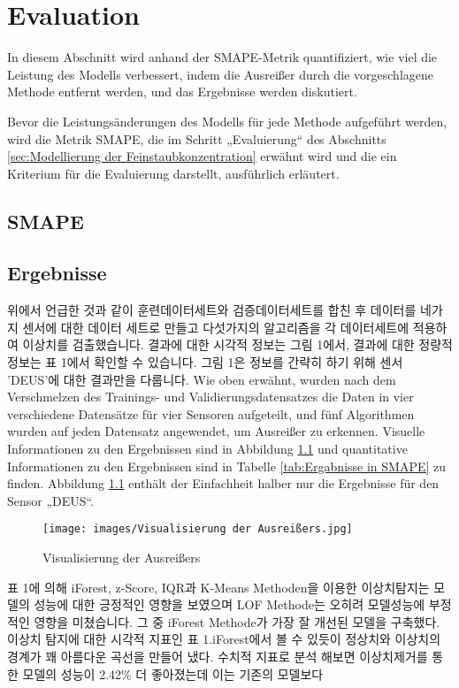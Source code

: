 \chapterpage\chapter{Evaluation}
    In diesem Abschnitt wird anhand der SMAPE-Metrik quantifiziert, wie viel die Leistung des Modells verbessert, indem die Ausreißer durch die vorgeschlagene Methode entfernt werden, und das Ergebnisse werden diskutiert.
    
    Bevor die Leistungsänderungen des Modells für jede Methode aufgeführt werden, wird die Metrik SMAPE, die im Schritt „Evaluierung“ des Abschnitts \ref{sec:Modellierung der Feinstaubkonzentration} erwähnt wird und die ein Kriterium für die Evaluierung darstellt, ausführlich erläutert.
    
    \section*{SMAPE}
    
    \section*{Ergebnisse}

        위에서 언급한 것과 같이 훈련데이터세트와 검증데이터세트를 합친 후 데이터를 네가지 센서에 대한 데이터 세트로 만들고 다섯가지의 알고리즘을 각 데이터세트에 적용하여 이상치를 검출했습니다. 결과에 대한 시각적 정보는 그림 1에서, 결과에 대한 정량적 정보는 표 1에서 확인할 수 있습니다. 그림 1은 정보를 간략히 하기 위해 센서 'DEUS'에 대한 결과만을 다룹니다.
        Wie oben erwähnt, wurden nach dem Verschmelzen des Trainings- und Validierungsdatensatzes die Daten in vier verschiedene Datensätze für vier Sensoren aufgeteilt, und fünf Algorithmen wurden auf jeden Datensatz angewendet, um Ausreißer zu erkennen. Visuelle Informationen zu den Ergebnissen sind in Abbildung \ref{fig:Ergebnisse in 2D} und quantitative Informationen zu den Ergebnissen sind in Tabelle \ref{tab:Ergabnisse in SMAPE} zu finden. Abbildung \ref{fig:Ergebnisse in 2D} enthält der Einfachheit halber nur die Ergebnisse für den Sensor „DEUS“.

        \begin{figure}[h]
            \centering
            \texttt{[image: images/Visualisierung der Ausreißers.jpg]}
            \caption{Visualisierung der Ausreißers}
            \label{fig:Ergebnisse in 2D}
        \end{figure}

        표 1에 의해 iForest, z-Score, IQR과 K-Means Methoden을 이용한 이상치탐지는 모델의 성능에 대한 긍정적인 영향을 보였으며 LOF Methode는 오히려 모델성능에 부정적인 영향을 미쳤습니다. 그 중 iForest Methode가 가장 잘 개선된 모델을 구축했다. 이상치 탐지에 대한 시각적 지표인 표 1.iForest에서 볼 수 있듯이 정상치와 이상치의 경계가 꽤 아름다운 곡선을 만들어 냈다. 수치적 지표로 분석 해보면 이상치제거를 통한 모델의 성능이 2.42\% 더 좋아졌는데 이는 기존의 모델보다 

